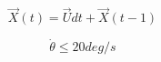 \documentclass[conf]{new-aiaa}
\begin{document}
\begin{equation}
\label{uavPosition}
\overrightarrow{X}(t) = \overrightarrow{U}dt + \overrightarrow{X}(t-1)
\end{equation}


\begin{equation}
\label{turnRate}
\dot{\theta} \leq 20 deg/s
\end{equation}










%
%
%
% 





%
%
%
%
%
\end{document}

